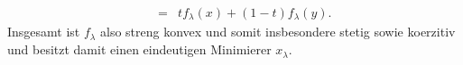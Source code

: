 \begin{compactenum}[(i)]
\begin{align*}
  &&=&t f_\lambda(x)+(1-t) f_\lambda(y).
 \end{align*}
 Insgesamt ist $f_\lambda$ also streng konvex und somit insbesondere stetig sowie koerzitiv und besitzt damit einen eindeutigen Minimierer $x_\lambda$.
 \\
 \item


\end{compactenum}

